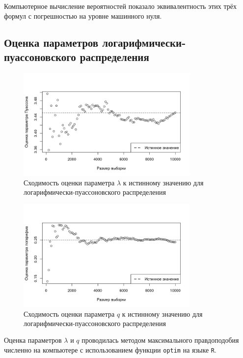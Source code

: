 \documentclass[12pt, specialist, subf, substylefile = spbu.rtx]{disser}
\begin{document}
	
	Компьютерное вычисление вероятностей показало эквивалентность этих трёх формул с погрешностью на уровне машинного нуля.
	
	\subsection{Оценка параметров логарифмически-пуассоновского распределения}
	
	\begin{figure}[!ht]
		\centering
		\includegraphics[width = 0.8\textwidth]{logpoislambda}
		\caption{Сходимость оценки параметра $\lambda$ к истинному значению для логарифмически-пуассоновского распределения}
		\label{img:logpoislambda}
	\end{figure}
	
	\begin{figure}[!ht]
		\centering
		\includegraphics[width = 0.8\textwidth]{logpoisq}
		\caption{Сходимость оценки параметра $q$ к истинному значению для логарифмически-пуассоновского распределения}
		\label{img:logpoisq}
	\end{figure}
	
	Оценка параметров $\lambda$ и $q$ проводилась методом максимального правдоподобия численно на компьютере с использованием функции \verb|optim| на языке \verb|R|.
	
\end{document}
